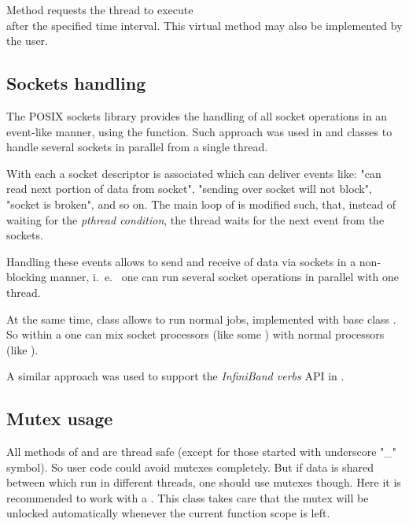 Method  
requests the thread to execute \\ 
after the specified time interval. This virtual method may also be implemented
by the user.  
 

\subsection{Sockets handling}
\label{prog_services_threads_sockets}
The POSIX sockets library provides the  handling of all socket operations in 
an event-like manner, using the  function. Such approach was used in  
 and  classes to 
handle several sockets in parallel from a single thread.

With each  a socket descriptor is associated which can
deliver events like: "can read next portion of data from socket", 
"sending over socket will not block", "socket is broken", and so on.
The main loop of  is modified such, that,
instead of waiting for the {\em pthread condition}, 
the thread waits for the next event from the sockets.

Handling these events allows to send and receive of data via sockets 
in a non-blocking manner, i.~e.~ one can run several socket 
operations in parallel with one thread.

At the same time,  class allows to run normal jobs,
implemented with base class . 
So within a  one can mix socket processors (like 
some ) with normal processors (like ).  

A similar approach was used to support the {\em InfiniBand verbs} API in \dabc. 


\subsection{Mutex usage}
\label{prog_services_threads_mutex}
All methods of  and  are thread
safe (except for those started with underscore "\_" symbol). 
So user code could avoid mutexes completely. But if data is shared between
 which run in different threads, one should use mutexes though. 
Here it is recommended to work with a
. This class takes care that the mutex will be unlocked
automatically whenever the current function scope is left. 

